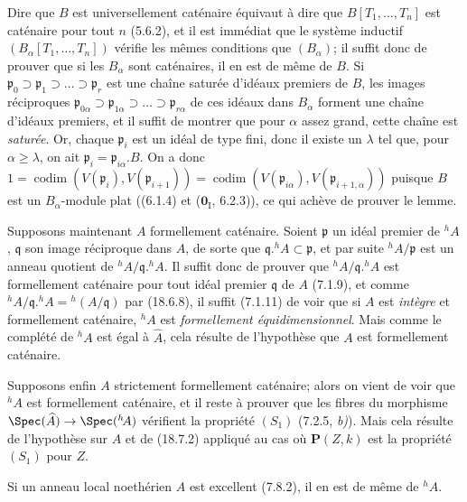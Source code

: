 Dire que $B$ est universellement caténaire équivaut à dire que $B[T_1,\ldots,T_n]$ est caténaire pour tout $n$ (5.6.2), et il est immédiat que le système inductif $(B_\alpha[T_1,\ldots,T_n])$ vérifie les mêmes conditions que $(B_\alpha)$; il suffit donc de prouver que si les $B_\alpha$ sont caténaires, il en est de même de $B$. Si $\mathfrak p_0\supset\mathfrak p_1\supset\ldots\supset\mathfrak p_r$ est une chaîne saturée d'idéaux premiers de $B$, les images réciproques $\mathfrak p_{0\alpha}\supset\mathfrak p_{1\alpha}\supset\ldots\supset\mathfrak p_{r\alpha}$ de ces idéaux dans $B_\alpha$ forment une chaîne d'idéaux premiers, et il suffit de montrer que pour $\alpha$ assez grand, cette chaîne est \emph{saturée}. Or, chaque $\mathfrak p_i$ est un idéal de type fini, donc il existe un $\lambda$ tel que, pour $\alpha\geq\lambda$, on ait $\mathfrak p_i=\mathfrak p_{i\alpha}.B$. On a donc $1=\operatorname{codim}(V(\mathfrak p_i),V(\mathfrak p_{i+1}))=\operatorname{codim}(V(\mathfrak p_{i\alpha}),V(\mathfrak p_{i+1,\alpha}))$ puisque $B$ est un $B_\alpha$-module plat ((6.1.4) et ($\mathbf{0}_{\mathrm I}$, 6.2.3)), ce qui achève de prouver le lemme.

Supposons maintenant $A$ formellement caténaire. Soient $\mathfrak p$ un idéal premier de ${}^h\!A$, $\mathfrak q$ son image réciproque dans $A$, de sorte que $\mathfrak q.{}^h\!A\subset\mathfrak p$, et par suite ${}^h\!A/\mathfrak p$ est un anneau quotient de ${}^h\!A/\mathfrak q.{}^h\!A$. Il suffit donc de prouver que ${}^h\!A/\mathfrak q.{}^h\!A$ est formellement caténaire pour tout idéal premier $\mathfrak q$ de $A$ (7.1.9), et comme ${}^h\!A/\mathfrak q.{}^h\!A={}^h(A/\mathfrak q)$ par (18.6.8), il suffit (7.1.11) de voir que si $A$ est \emph{intègre} et formellement caténaire, ${}^h\!A$ est \emph{formellement équidimensionnel}. Mais comme le complété de ${}^h\!A$ est égal à $\widehat A$, cela résulte de l'hypothèse que $A$ est formellement caténaire.


Supposons enfin $A$ strictement formellement caténaire; alors on vient de voir que ${}^h\!A$ est formellement caténaire, et il reste à prouver que les fibres du morphisme $\Spec(\widehat A)\to\Spec({}^h\!A)$ vérifient la propriété $(S_1)$ (7.2.5, \emph{b)}). Mais cela résulte de l'hypothèse sur $A$ et de (18.7.2) appliqué au cas où $\boldsymbol{P}(Z,k)$ est la propriété $(S_1)$ pour $Z$.

\begin{corollary}[18.7.6]
\label{IV.18.7.6}
Si un anneau local noethérien $A$ est excellent \textup{(7.8.2)}, il en est de même de ${}^h\!A$.
\end{corollary}

